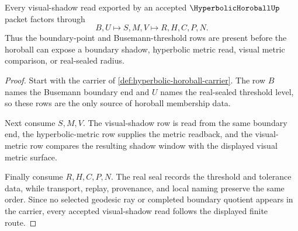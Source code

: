 \begin{theorem}
\label{thm:hyperbolic-horoball-shadow-route}
Every visual-shadow read exported by an accepted $\HyperbolicHoroballUp$ packet factors through
$$
B,U \longmapsto S,M,V \longmapsto R,H,C,P,N .
$$
Thus the boundary-point and Busemann-threshold rows are present before the horoball can expose a boundary shadow, hyperbolic metric read, visual metric comparison, or real-sealed radius.
\end{theorem}
\begin{proof}
Start with the carrier of \autoref{def:hyperbolic-horoball-carrier}. The row $B$ names the Busemann boundary end and $U$ names the real-sealed threshold level, so these rows are the only source of horoball membership data.

Next consume $S,M,V$. The visual-shadow row is read from the same boundary end, the hyperbolic-metric row supplies the metric readback, and the visual-metric row compares the resulting shadow window with the displayed visual metric surface.

Finally consume $R,H,C,P,N$. The real seal records the threshold and tolerance data, while transport, replay, provenance, and local naming preserve the same order. Since no selected geodesic ray or completed boundary quotient appears in the carrier, every accepted visual-shadow read follows the displayed finite route.
\end{proof}




